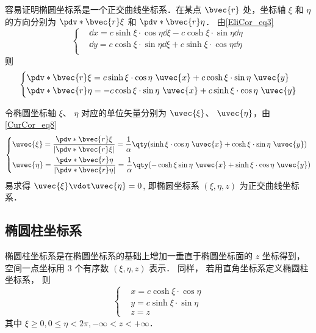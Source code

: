 容易证明椭圆坐标系是一个正交曲线坐标系．在某点 $\bvec{r}$ 处，坐标轴 $\xi$ 和 $\eta$ 的方向分别为 $\pdv*{\bvec{r}}{\xi}$ 和 $\pdv*{\bvec{r}}{\eta}$．
由\autoref{EliCor_eq3} 
\begin{equation}
\left\{
    \begin{aligned}
    &\dd x=c\sinh\xi\cdot\cos\eta\dd\xi-c\cosh\xi\cdot\sin\eta\dd\eta\\
    &\dd y=c\cosh\xi\cdot\sin\eta\dd\xi+c\sinh\xi\cdot\cos\eta\dd\eta\\
    \end{aligned}\right.
\end{equation}
则
\begin{equation}
\left\{
    \begin{aligned}
&\pdv*{\bvec{r}}{\xi}=c\sinh\xi\cdot\cos\eta\ \uvec{x}+c\cosh\xi\cdot\sin\eta\ \uvec{y}\\
&\pdv*{\bvec{r}}{\eta}=-c\cosh\xi\cdot\sin\eta\ \uvec{x}+c\sinh\xi\cdot\cos\eta\ \uvec{y}\\
    \end{aligned}\right.
\end{equation}

令椭圆坐标轴 $\xi$、 $\eta$ 对应的单位矢量分别为 $\uvec{\xi}$、 $\uvec{\eta}$，由\autoref{CurCor_eq8}~
\begin{equation}
\left\{
    \begin{aligned}
    &\uvec{\xi}=\frac{\pdv*{\bvec{r}}{\xi}}{|\pdv*{\bvec{r}}{\xi}|}=\frac{1}{\alpha}\qty(\sinh\xi\cdot\cos\eta\ \uvec{x}+\cosh\xi\cdot\sin\eta\ \uvec{y})\\
    &\uvec{\eta }=\frac{\pdv*{\bvec{r}}{\eta}}{|\pdv*{\bvec{r}}{\eta}|}=\frac{1}{\alpha}\qty(-\cosh\xi\sin\eta\ \uvec{x}+\sinh\xi\cdot\cos\eta\ \uvec{y})\\
    \end{aligned}\right.
\end{equation}
易求得 $\uvec{\xi}\vdot\uvec{\eta} = 0$,  即椭圆坐标系 $(\xi,\eta,z)$ 为正交曲线坐标系．

\subsection{椭圆柱坐标系}
椭圆柱坐标系是在椭圆坐标系的基础上增加一垂直于椭圆坐标面的 $z$ 坐标得到， 空间一点坐标用 3 个有序数 $(\xi,\eta,z)$ 表示． 同样， 若用直角坐标系定义椭圆柱坐标系， 则
\begin{equation}\label{EliCor_eq1}
\left\{\begin{aligned}
&x=c\cosh\xi\cdot\cos\eta\\
&y=c\sinh\xi\cdot\sin\eta\\
&z=z
\end{aligned}\right.
\end{equation}
其中 $\xi\geq0,0\leq\eta<2\pi,-\infty<z<+\infty$．

